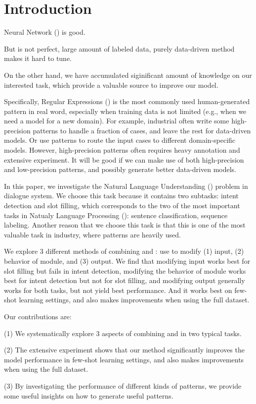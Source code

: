 \section{Introduction}
Neural Network (\NN) is good.

But \NN is not perfect, large amount of labeled data, purely data-driven method makes it hard to tune.

On the other hand, we have accumulated siginificant amount of knowledge on our interested task, which provide a valuable source to improve our model.

Specifically, Regular Expressions (\RE) is the most commonly used human-generated pattern in real word, especially when training data is not limited (e.g., when we need a model for a new domain). For example, industrial often write some high-precision \RE patterns to handle a fraction of cases, and leave the rest for data-driven models. Or use \RE patterns to route the input cases to different domain-specific models. However, high-precision patterns often requires heavy annotation and extensive experiment. It will be good if we can make use of both high-precision and low-precision patterns, and possibly generate better data-driven models.

In this paper, we investigate the Natural Language Understanding (\NLU) problem in dialogue system. We choose this task because it contains two subtasks: intent detection and slot filling, which corresponds to the two of the most important tasks in Natualy Language Processing (\NLP): sentence classification, sequence labeling. Another reason that we choose this task is that this is one of the most valuable \NLP task in industry, where \RE patterns are heavily used.

We explore 3 different methods of combining \RE and \NN: use \RE to modify (1) \NN input, (2) behavior of \NN module, and (3) \NN output. We find that modifying \NN input works best for slot filling but fails in intent detection, modifying the behavior of \NN module works best for intent detection but not for slot filling, and modifying \NN output generally works for both tasks, but not yield best performance. And it works best on few-shot learning settings, and also makes improvements when using the full dataset.

Our contributions are: 

(1) We systematically explore 3 aspects of combining \RE and \NN in two typical \NLP tasks.

(2) The extensive experiment shows that our method significantly improves the model performance in few-shot learning settings, and also makes improvements when using the full dataset.

(3) By investigating the performance of different kinds of \RE patterns, we provide some useful insights on how to generate useful \RE patterns.

